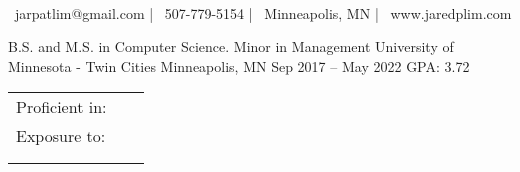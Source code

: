 \documentclass[]{awesome-cv}
\begin{document}
    
\begin{center}
	  \\
	\vspace{2mm}
	{\faEnvelope\ jarpatlim@gmail.com} | {\faMobile\ 507-779-5154} | {\faMapMarker\ Minneapolis, MN} | 
	{\faGlobe\ www.jaredplim.com}
\end{center}
\begin{cventries}
	\cventry
	{B.S. and M.S. in Computer Science. Minor in Management}
	{University of Minnesota - Twin Cities}
	{Minneapolis, MN}
	{Sep 2017 – May 2022}
	{GPA: 3.72}
\end{cventries}

\vspace{-2mm}
\begin{cventries}
	\vspace{-3mm}
	\cventry
	{}
	{\def\arraystretch{1.50}{\begin{tabular}{ l l }
	    Proficient in: \  & {\skill{Python, Java, C++, C, Git}} \\
		Exposure to:  & {\skill{Django, Spring Boot, AWS, Kubernetes, Docker, Drone, Gitlab, Jira, Azure DevOps, Oracle, Ansible, }} \\
		& {\skill{Vue.js, React, Node.js, Express.js, MongoDB, .NET Core, Groovy, Kotlin, Spock, Flask, Click, OCaml}}\\
		& {\skill{SQL, TypeScript/JavaScript, HTML/CSS, JUnit, Unix Programming}}\\
		\end{tabular}}}
	{}
	{}
	{}
\end{cventries}
\end{document}
